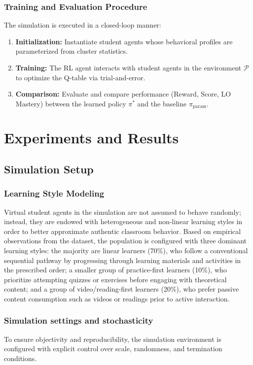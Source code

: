 \documentclass[conference]{IEEEtran}
\begin{document}
\subsubsection{Training and Evaluation Procedure}
The simulation is executed in a closed-loop manner:
\begin{enumerate}
    \item \textbf{Initialization:} Instantiate student agents whose behavioral profiles are parameterized from cluster statistics.
    \item \textbf{Training:} The RL agent interacts with student agents in the environment $\mathcal{P}$ to optimize the Q-table via trial-and-error.
    \item \textbf{Comparison:} Evaluate and compare performance (Reward, Score, LO Mastery) between the learned policy $\pi^*$ and the baseline $\pi_{\text{param}}$.
\end{enumerate}

\section{Experiments and Results}
\label{sec:experiments}

\subsection{Simulation Setup}

\subsubsection{Learning Style Modeling}
Virtual student agents in the simulation are not assumed to behave randomly; instead, they are endowed with heterogeneous and non-linear learning styles in order to better approximate authentic classroom behavior. Based on empirical observations from the dataset, the population is configured with three dominant learning styles: the majority are linear learners (70\%), who follow a conventional sequential pathway by progressing through learning materials and activities in the prescribed order; a smaller group of practice-first learners (10\%), who prioritize attempting quizzes or exercises before engaging with theoretical content; and a group of video/reading-first learners (20\%), who prefer passive content consumption such as videos or readings prior to active interaction.

\subsubsection{Simulation settings and stochasticity}
To ensure objectivity and reproducibility, the simulation environment is configured with explicit control over scale, randomness, and termination conditions.
\end{document}
